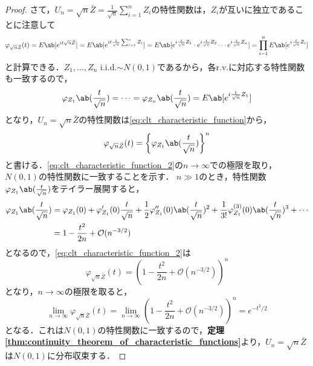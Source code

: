 \documentclass[main.tex]{subfiles}
\begin{document}
\begin{proof}
さて，$U_n = \sqrt{n} \bar{Z} = \frac{1}{\sqrt{n}} \sum_{i=1}^{n} Z_i$の特性関数は，$Z_i$が互いに独立であることに注意して
\begin{equation}
  \varphi_{\sqrt{n} \bar{Z}} (t) = E \ab [e^{it \sqrt{n} \bar{Z}}] = E \ab [e^{it \frac{1}{\sqrt{n}} \sum_{i=1}^{n} Z_i}] = E \ab [e^{i \frac{t}{\sqrt{n}} Z_1} \cdot e^{i \frac{t}{\sqrt{n}} Z_2} \cdots e^{i \frac{t}{\sqrt{n}} Z_n}] 
  = \prod_{i=1}^{n} E \ab [e^{i \frac{t}{\sqrt{n}} Z_i}]
  \label{eq:clt_characteristic_function} 
\end{equation}
と計算できる．$Z_1,\dots,Z_n$ i.i.d.$\sim N(0,1)$であるから，各r.v.に対応する特性関数も一致するので，
\begin{equation}
  \varphi_{Z_1} \ab(\frac{t}{\sqrt{n}}) = \cdots = \varphi_{Z_n} \ab (\frac{t}{\sqrt{n}}) = E \ab [e^{i \frac{t}{\sqrt{n}} Z_1}]
\end{equation}
となり，$U_n = \sqrt{n} \bar{Z}$の特性関数は\eqref{eq:clt_characteristic_function}から，
\begin{equation}
  \varphi_{\sqrt{n} \bar{Z}} (t) = \left\{ \varphi_{Z_1} \ab (\frac{t}{\sqrt{n}}) \right\}^n
  \label{eq:clt_characteristic_function_2}
\end{equation}
と書ける．\eqref{eq:clt_characteristic_function_2}の$n \to \infty$での極限を取り，$N(0,1)$の特性関数に一致することを示す．
$n \gg 1$のとき，特性関数$\varphi_{Z_1} \ab (\frac{t}{\sqrt{n}})$をテイラー展開すると，
\begin{align}
  \varphi_{Z_1} \ab (\frac{t}{\sqrt{n}}) &= \varphi_{Z_1}(0) + \varphi'_{Z_1}(0) \frac{t}{\sqrt{n}} + \frac{1}{2} \varphi''_{Z_1}(0) \ab (\frac{t}{\sqrt{n}})^2 + \frac{1}{3!} \varphi^{(3)}_{Z_1}(0) \ab (\frac{t}{\sqrt{n}})^3 + \cdots \notag \\
  &= 1 - \frac{t^2}{2n} + \mathcal{O}(n^{-3/2})
  \label{eq:clt_characteristic_function_taylor}
\end{align}
となるので，\eqref{eq:clt_characteristic_function_2}は
\begin{equation}
  \varphi_{\sqrt{n} \bar{Z}} (t) = \left( 1 - \frac{t^2}{2n} + \mathcal{O}(n^{-3/2}) \right)^n
  \label{eq:clt_characteristic_function_3}
\end{equation}
となり，$n \to \infty$の極限を取ると，
\begin{equation}
  \lim_{n \to \infty} \varphi_{\sqrt{n} \bar{Z}} (t) = \lim_{n \to \infty} \left( 1 - \frac{t^2}{2n} + \mathcal{O}(n^{-3/2}) \right)^n = e^{-t^2/2}
\end{equation}
となる．これは$ N(0,1)$の特性関数に一致するので，\textbf{定理 \ref{thm:continuity_theorem_of_characteristic_functions}}より，$U_n = \sqrt{n} \bar{Z}$は$N(0,1)$に分布収束する．
\end{proof}
\end{document}
